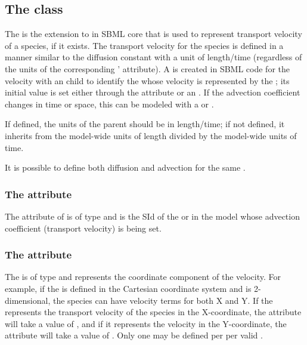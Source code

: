 \subsection{The  class}
\label{advectioncoefficient-class}
The \AdvectionCoefficient is the extension to \Parameter in SBML core that is used to represent transport velocity of a species, if it exists. The transport velocity for the species is defined in a manner similar to the diffusion constant with a unit of length/time (regardless of the units of the corresponding \Species'  attribute).  A \Parameter is created in SBML code for the velocity with an \AdvectionCoefficient child to identify the \Species whose velocity is represented by the \Parameter; its initial value is set either through the  attribute or an \InitialAssignment.    If the advection coefficient changes in time or space, this can be modeled with a \Rule or \Event.

If defined, the units of the parent \Parameter should be in length/time; if not defined, it inherits from the model-wide units of length divided by the model-wide units of time.

It is possible to define both diffusion and advection for the same \Species.

\subsubsection{The \fixttspace{} attribute}
The  attribute of \AdvectionCoefficient is of type  and is the SId of the \Species or \Parameter in the model whose advection coefficient (transport velocity) is being set.

\subsubsection{The \fixttspace{} attribute}
The  is of type  and represents the coordinate component of the velocity. For example, if the \Geometry is defined in the Cartesian coordinate system and is 2-dimensional, the species can have velocity terms for both X and Y. If the \Parameter represents the transport velocity of the species in the X-coordinate, the  attribute will take a value of , and if it represents the velocity in the Y-coordinate, the attribute will take a value of .  Only one \AdvectionCoefficient may be defined per \Species per valid .


